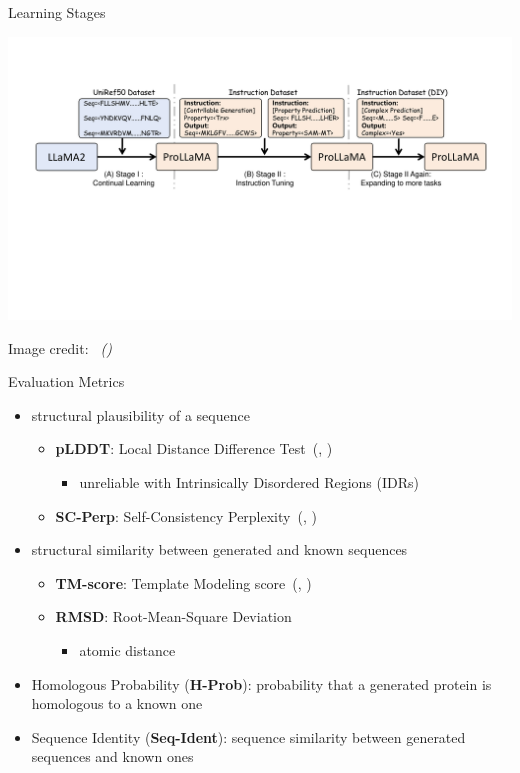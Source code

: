 \documentclass[dvipsnames,
hyperref={citecolor=black}
]{beamer}
\newcommand{\credit}[2]{{\par\hfill \tiny #1 credit:~\itshape\citeauthor{#2} (\citeyear{#2})}}
\renewcommand{\cite}[1]{(\citeauthor{#1}, \citeyear{#1})}
\newcommand{\red}[1]{{\color{red} #1}}
\begin{document}
\begin{frame}{Learning Stages}
	\begin{center}
		\includegraphics[scale=0.39]{images/training.pdf}
	\end{center}
	\credit{Image}{lv2024prollama}
\end{frame}

\begin{frame}{Evaluation Metrics}
	\begin{itemize}
		\item structural plausibility of a sequence
		\begin{itemize}
			\item \textbf{pLDDT}: Local Distance Difference Test~\cite{jumper2021highly}
			\begin{itemize}
				\item \red{unreliable with Intrinsically Disordered Regions (IDRs)}
			\end{itemize}
			\item \textbf{SC-Perp}: Self-Consistency Perplexity~\cite{alamdari2023protein}
		\end{itemize}
		\item structural similarity between generated and known sequences
		\begin{itemize}
			\item \textbf{TM-score}: Template Modeling score~\cite{zhang2004scoring}
			\item \textbf{RMSD}:  Root-Mean-Square Deviation
			\begin{itemize}
				\item atomic distance
			\end{itemize}
		\end{itemize}
		\item Homologous Probability (\textbf{H-Prob}): probability that a generated protein is homologous to a known one
		\item Sequence Identity (\textbf{Seq-Ident}): sequence similarity between generated sequences and known ones
	\end{itemize}
\end{frame}
\end{document}
